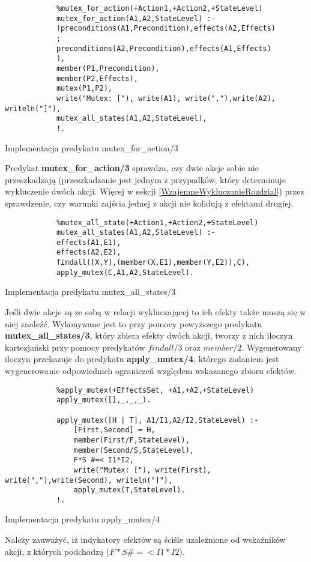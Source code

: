     \begin{listing}[H]
        \begin{verbatim}
            %mutex_for_action(+Action1,+Action2,+StateLevel)
            mutex_for_action(A1,A2,StateLevel) :-
            (preconditions(A1,Precondition),effects(A2,Effects)
            ;
            preconditions(A2,Precondition),effects(A1,Effects)
            ),
            member(P1,Precondition),
            member(P2,Effects),
            mutex(P1,P2),
            write("Mutex: ["), write(A1), write(","),write(A2), writeln("]"),
            mutex_all_states(A1,A2,StateLevel),
            !.
    \end{verbatim}
    \caption{Implementacja predykatu mutex\_for\_action/3}
    \end{listing}

    Predykat \textbf{mutex\_for\_action/3} sprawdza, czy dwie akcje sobie nie przeszkadzają (przeszkadzanie jest jednym z przypadków, który determinuje 
    wykluczenie dwóch akcji. Więcej w sekcji \ref{WzajemneWykluczanieRozdzial}) przez sprawdzenie, czy warunki zajścia jednej z akcji nie kolidują 
    z efektami drugiej.
    \begin{listing}[H]
        \begin{verbatim}
            %mutex_all_state(+Action1,+Action2,+StateLevel)
            mutex_all_states(A1,A2,StateLevel) :-
            effects(A1,E1),
            effects(A2,E2),
            findall([X,Y],(member(X,E1),member(Y,E2)),C),
            apply_mutex(C,A1,A2,StateLevel).
    \end{verbatim}
    \caption{Implementacja predykatu mutex\_all\_states/3}

    Jeśli dwie akcje są ze sobą w relacji wykluczającej to ich efekty także muszą się w niej znaleźć. Wykonywane jest to przy pomocy powyższego 
    predykatu \textbf{mutex\_all\_states/3}, który zbiera efekty dwóch akcji, tworzy z nich iloczyn kartezjański przy pomocy predykatów 
    $findall/3$ oraz $member/2$. Wygenerowany iloczyn przekazuje do predykatu \textbf{apply\_mutex/4}, którego zadaniem jest wygenerowanie 
    odpowiednich ograniczeń względem wskazanego zbioru efektów.
    \end{listing}

    \begin{listing}[H]
        \begin{verbatim}
            %apply_mutex(+EffectsSet, +A1,+A2,+StateLevel)
            apply_mutex([],_,_,_).

            apply_mutex([H | T], A1/I1,A2/I2,StateLevel) :-
                [First,Second] = H, 
                member(First/F,StateLevel),
                member(Second/S,StateLevel),
                F*S #=< I1*I2,
                write("Mutex: ["), write(First), write(","),write(Second), writeln("]"),
                apply_mutex(T,StateLevel).
            !.
    \end{verbatim}
    \caption{Implementacja predykatu apply\_mutex/4}
    \end{listing}
    Należy zauważyć, iż indykatory efektów są ściśle uzależnione od wskaźników akcji, z których podchodzą ($F*S \#=< I1*I2$).

